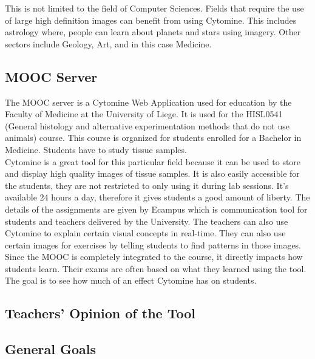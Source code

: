 \documentclass[a4paper,11pt]{report}
\numberwithin{figure}{section} %
\begin{document}
This is not limited to the field of Computer Sciences. Fields that require the use of large high definition images can benefit from using Cytomine. This includes astrology where, people can learn about planets and stars using imagery. Other sectors include Geology, Art, and in this case Medicine.


\subsection{MOOC Server}

The MOOC server is a Cytomine Web Application used for education by the Faculty of Medicine at the University of Liege. It is used for the HISL0541 (General histology and alternative experimentation methods that do not use animals) course. This course is organized for students enrolled for a Bachelor in Medicine. Students have to study tissue samples. \\

Cytomine is a great tool for this particular field because it can be used to store and display high quality images of tissue samples. It is also easily accessible for the students, they are not restricted to only using it during lab sessions. It's available 24 hours a day, therefore it gives students a good amount of liberty. The details of the assignments are given by Ecampus which is communication tool for students and teachers delivered by the University. The teachers can also use Cytomine to explain certain visual concepts in real-time. They can also use certain images for exercises by telling students to find patterns in those images.\\

Since the MOOC is completely integrated to the course, it directly impacts how students learn. Their exams are often based on what they learned using the tool. The goal is to see how much of an effect Cytomine has on students.

\subsection{Teachers' Opinion of the Tool}
\subsection{General Goals}
\end{document}
